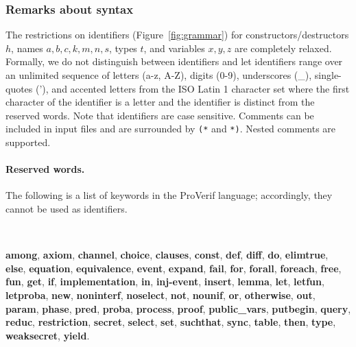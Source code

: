 \documentclass{book}
\begin{document}
\subsubsection{Remarks about syntax}\label{sec:syntaxRemarks}

The restrictions on identifiers (Figure~\ref{fig:grammar}) for constructors/destructors $h$, names $a,b,c,k,m,n,s$, types $t$, and variables $x,y,z$ are completely relaxed. Formally, we do not distinguish between identifiers and let identifiers range over an unlimited sequence of letters (a-z, A-Z), digits (0-9), underscores (\_), single-quotes ('), and accented letters from the ISO Latin 1 character set where the first character of the identifier is a letter and the identifier is distinct from the reserved words. Note that identifiers are case sensitive.
%
Comments can be included in input files and are surrounded by \texttt{(*} and \texttt{*)}. Nested comments are supported.
%

\paragraph{Reserved words.}

\newcommand{\rword}[1]{\textbf{#1}}


The following is a list of keywords in the ProVerif language; accordingly, they cannot be used as identifiers.

\

\noindent
\rword{among}, \rword{axiom},
\rword{channel},
\rword{choice}, \rword{clauses}, \rword{const},
\rword{def}, \rword{diff}, \rword{do},
\rword{elimtrue}, \rword{else}, \rword{equation}, \rword{equivalence},
\rword{event}, \rword{expand}, \rword{fail}, \rword{for}, \rword{forall},
\rword{foreach}, \rword{free},
\rword{fun}, \rword{get}, \rword{if},
\rword{implementation}, \rword{in}, \rword{inj-event},
\rword{insert}, \rword{lemma}, \rword{let}, \rword{letfun}, \rword{letproba}, \rword{new},
\rword{noninterf}, \rword{noselect}, \rword{not}, \rword{nounif}, \rword{or},
\rword{otherwise}, \rword{out},
\rword{param}, \rword{phase}, \rword{pred}, \rword{proba},
\rword{process}, \rword{proof}, \rword{public\_vars},
\rword{putbegin}, \rword{query}, \rword{reduc}, \rword{restriction}, \rword{secret},
\rword{select}, \rword{set},
\rword{suchthat}, \rword{sync}, \rword{table}, \rword{then}, \rword{type},
\rword{weaksecret}, \rword{yield}.

\
\end{document}

